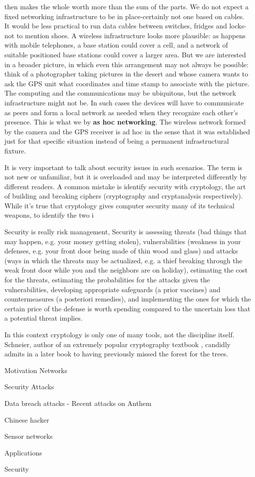 	then makes the whole worth more than the sum of the parts.
	We do not expect a fixed networking infrastructure to be in place-certainly not one based on cables.
	It would be less practical to run data cables between switches, fridges and locks-not to mention shoes.
	A wireless infrastructure looks more plausible: as happens with mobile telephones, a base station could cover a cell, and a network of suitable positioned base stations could cover a larger area.
	But we are interested in a broader picture, in which even this arrangement may not always be possible: think of a photographer taking pictures in the desert and whose camera wants to ask the GPS unit what coordinates and time stamp to associate with the picture.
	The computing and the communications may be ubiquitous, but the network infrastructure might not be.
	In such cases the devices will have to communicate as peers and form a local network as needed when they recognize each other's presence.
	This is what we by \textbf{as hoc networking}.
	The wireless network formed by the camera and the GPS receiver is ad hoc in the sense that it was established just for that specific situation instead of being a permanent infrastructural fixture.

	It is very important to talk about security issues in such scenarios.
	The term is not new or unfamiliar, but it is overloaded and may be interpreted differently by different readers.
	A common mistake is identify security with cryptology, the art of building and breaking ciphers (cryptography and cryptanalysis respectively).
	While it's true that cryptology gives computer security many of its technical weapons, to identify the two i                                

	Security is really risk management, 
	Security is assessing threats (bad things that may happen, e.g. your money getting stolen), vulnerabilities (weakness in your defenses, e.g. your front door being made of thin wood and glass) and attacks (ways in which the threats may be actualized, e.g. a thief breaking through the weak front door while you and the neighbors are on holiday), estimating the cost for the threats, estimating the probabilities for the attacks given the vulnerabilities, developing appropriate safeguards (a prior vaccines) and countermeasures (a posteriori remedies), and implementing the ones for which the certain price of the defense is worth spending compared to the uncertain loss that a potential threat implies.

	In this context cryptology is only one of many tools, not the discipline itself.
	Schneier, author of an extremely popular cryptography textbook \cite{schneider1996applied}, candidly admits in a later book \cite{schneier2011secrets} to having previously missed the forest for the trees.
	
	Motivation
	Networks

	Security Attacks
		
		Data breach attacks\cite{anthem} - 	Recent attacks on Anthem
		
		Chinese hacker


	Sensor networks

	Applications

	Security

